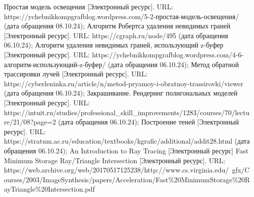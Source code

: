 \begin{thebibliography}{}
	 Простая модель освещения [Электронный ресурс]. URL: https://ychebnikkompgrafblog.wordpress.com/5-2-простая-модель-освещения/ (дата обращения 08.10.24);
	 Алгоритм Робертса удаления невидимых граней [Электронный ресурс]. URL: https://cgraph.ru/node/495 (дата обращения 06.10.24);
	 Алгоритм удаления невидимых граней, использующий z-буфер [Электронный ресурс]. URL: https://ychebnikkompgrafblog.wordpress.com/4-6-алгоритм-использующий-z-буфер/ (дата обращения 06.10.24);
	 Метод обратной трассировки лучей [Электронный ресурс]. URL: https://cyberleninka.ru/article/n/metod-pryamoy-i-obratnoy-trassirovki/viewer (дата обращения 06.10.24);
	 Закрашивание. Рендеринг полигональных моделей [Электронный ресурс]. URL: https://intuit.ru/studies/professional\_skill\_improvements/1283/courses/70/lecture/21/08?page=2 (дата обращения 06.10.24);
	 Построение теней [Электронный ресурс]. URL: https://stratum.ac.ru/education/textbooks/kgrafic/additional/addit28.html (дата обращения 06.10.24);
	 An Introduction to Ray Tracing [Электронный ресурс] 
	 Fast Minimum Storage Ray/Triangle Intersection [Электронный ресурс]. URL: https://web.archive.org/web/20170517125238/http://www.cs.virginia.edu/~gfx/Courses/2003/ImageSynthesis/papers/Acceleration/Fast\%20MinimumStorage\%20RayTriangle\%20Intersection.pdf
\end{thebibliography}
